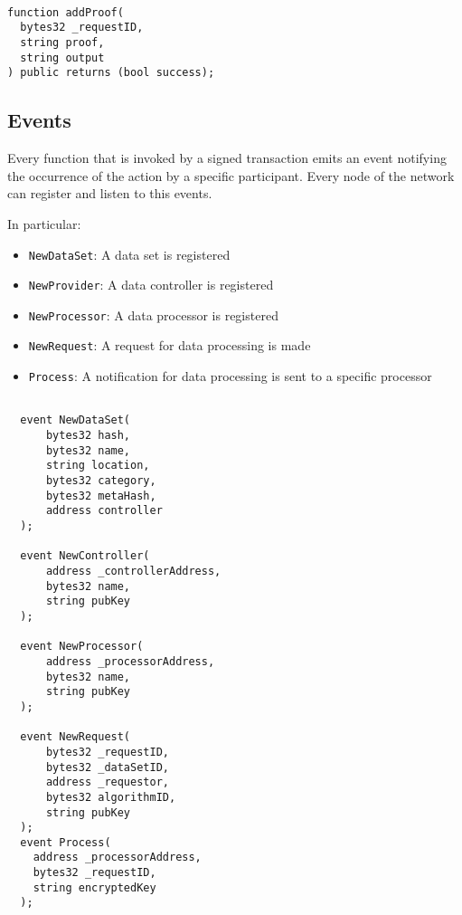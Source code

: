 \begin{lstlisting}[language=Solidity, caption={Data sharing application events}]

function addProof(
  bytes32 _requestID,
  string proof,
  string output
) public returns (bool success);

\end{lstlisting}
\subsection{Events}
\label{implemenation:contracts:events}

Every function that is invoked by a signed transaction emits an event notifying the occurrence of the action by a specific participant. Every node of the network can register and listen to this events.

In particular:

\begin{itemize}
  \item \verb|NewDataSet|: A data set is registered
  \item \verb|NewProvider|: A data controller is registered
  \item \verb|NewProcessor|: A data processor is registered
  \item \verb|NewRequest|: A request for data processing is made
  \item \verb|Process|: A notification for data processing is sent to a specific processor
\end{itemize}

\begin{lstlisting}[language=Solidity, caption={Data sharing application events}]

  event NewDataSet(
      bytes32 hash,
      bytes32 name,
      string location,
      bytes32 category,
      bytes32 metaHash,
      address controller
  );

  event NewController(
      address _controllerAddress,
      bytes32 name,
      string pubKey
  );

  event NewProcessor(
      address _processorAddress,
      bytes32 name,
      string pubKey
  );

  event NewRequest(
      bytes32 _requestID,
      bytes32 _dataSetID,
      address _requestor,
      bytes32 algorithmID,
      string pubKey
  );
  event Process(
    address _processorAddress,
    bytes32 _requestID,
    string encryptedKey
  );
\end{lstlisting}

